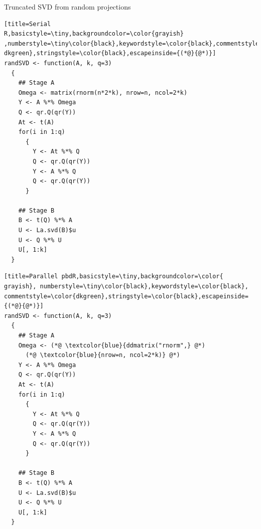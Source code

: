 \begin{frame}[fragile]
 \fontsize{8pt}{10}\selectfont
\begin{block}{Truncated SVD from random projections}
  \hfill
  \begin{minipage}{0.430\textwidth}
\begin{lstlisting}[title=Serial
R,basicstyle=\tiny,backgroundcolor=\color{grayish}
,numberstyle=\tiny\color{black},keywordstyle=\color{black},commentstyle=\color{
dkgreen},stringstyle=\color{black},escapeinside={(*@}{@*)}]
randSVD <- function(A, k, q=3)
  {
    ## Stage A
    Omega <- matrix(rnorm(n*2*k), nrow=n, ncol=2*k)
    Y <- A %*% Omega
    Q <- qr.Q(qr(Y))
    At <- t(A)
    for(i in 1:q)
      {
        Y <- At %*% Q
        Q <- qr.Q(qr(Y))
        Y <- A %*% Q
        Q <- qr.Q(qr(Y))
      }

    ## Stage B
    B <- t(Q) %*% A
    U <- La.svd(B)$u
    U <- Q %*% U
    U[, 1:k]
  }
\end{lstlisting} %
  \end{minipage}
  \hfill
  \begin{minipage}{0.430\textwidth}
\begin{lstlisting}[title=Parallel pbdR,basicstyle=\tiny,backgroundcolor=\color{
grayish}, numberstyle=\tiny\color{black},keywordstyle=\color{black},
commentstyle=\color{dkgreen},stringstyle=\color{black},escapeinside={(*@}{@*)}]
randSVD <- function(A, k, q=3)
  {
    ## Stage A
    Omega <- (*@ \textcolor{blue}{ddmatrix("rnorm",} @*)
      (*@ \textcolor{blue}{nrow=n, ncol=2*k)} @*)
    Y <- A %*% Omega
    Q <- qr.Q(qr(Y))
    At <- t(A)
    for(i in 1:q)
      {
        Y <- At %*% Q
        Q <- qr.Q(qr(Y))
        Y <- A %*% Q
        Q <- qr.Q(qr(Y))
      }

    ## Stage B
    B <- t(Q) %*% A
    U <- La.svd(B)$u
    U <- Q %*% U
    U[, 1:k]
  }
\end{lstlisting}  %
  \end{minipage}
\hfill
\end{block}
\end{frame}

